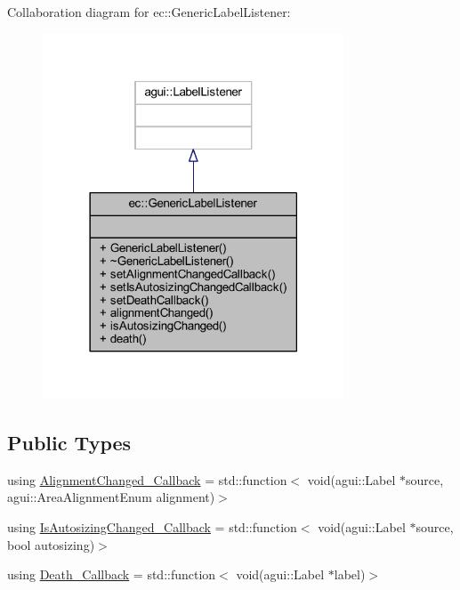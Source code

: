 Collaboration diagram for ec\+:\+:Generic\+Label\+Listener\+:\nopagebreak
\begin{figure}[H]
\begin{center}
\leavevmode
\includegraphics[width=254pt]{classec_1_1_generic_label_listener__coll__graph}
\end{center}
\end{figure}
\subsection*{Public Types}
\begin{DoxyCompactItemize}
\item 
using \mbox{\hyperlink{classec_1_1_generic_label_listener_af470c076b7748036de36bc1d99bce445}{Alignment\+Changed\+\_\+\+Callback}} = std\+::function$<$ void(agui\+::\+Label $\ast$source, agui\+::\+Area\+Alignment\+Enum alignment)$>$
\item 
using \mbox{\hyperlink{classec_1_1_generic_label_listener_adf4cec1bd13682ce66c52f0484fe46c6}{Is\+Autosizing\+Changed\+\_\+\+Callback}} = std\+::function$<$ void(agui\+::\+Label $\ast$source, bool autosizing)$>$
\item 
using \mbox{\hyperlink{classec_1_1_generic_label_listener_af79a68f4cb5c696fa1d921e7441d93eb}{Death\+\_\+\+Callback}} = std\+::function$<$ void(agui\+::\+Label $\ast$label)$>$
\end{DoxyCompactItemize}
